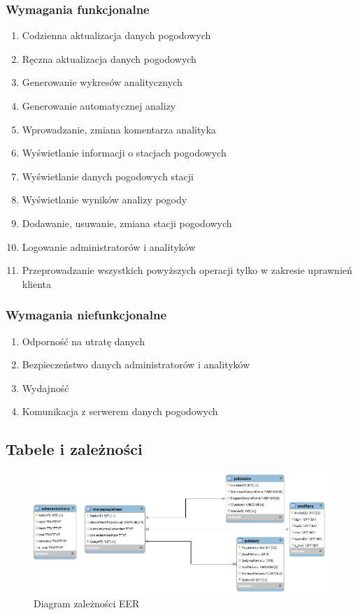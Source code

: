 \documentclass[12pt,a4paper]{article}
\begin{document}
\subsubsection{Wymagania funkcjonalne}
\begin{enumerate}
\item Codzienna aktualizacja danych pogodowych
\item Ręczna aktualizacja danych pogodowych
\item Generowanie wykresów analitycznych
\item Generowanie automatycznej analizy
\item Wprowadzanie, zmiana komentarza analityka
\item Wyświetlanie informacji o stacjach pogodowych
\item Wyświetlanie danych pogodowych stacji
\item Wyświetlanie wyników analizy pogody
\item Dodawanie, usuwanie, zmiana stacji pogodowych
\item Logowanie administratorów i analityków
\item Przeprowadzanie wszystkich powyższych operacji tylko w zakresie uprawnień klienta
\end{enumerate}
\subsubsection{Wymagania niefunkcjonalne}
\begin{enumerate}
\item Odporność na utratę danych
\item Bezpieczeństwo danych administratorów i analityków
\item Wydajność
\item Komunikacja z serwerem danych pogodowych
\end{enumerate}

\newpage
\subsection{Tabele i zależności}

\begin{figure}[!htb]
\includegraphics[width=\textwidth]{./figures/diagram_zwiazkow.png}
\caption{Diagram zależności EER}
\end{figure}
\end{document}
